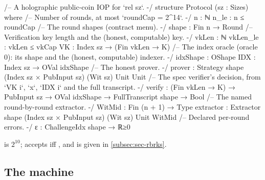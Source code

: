 \begin{leancode}[fontsize=\footnotesize,label={\footnotesize Contract/Protocol.lean (abridged)}]
/-- A holographic public-coin IOP for `rel sz`. -/
structure Protocol (sz : Sizes) where
  /-- Number of rounds, at most `roundCap = 2^14`. -/
  n : ℕ
  n_le : n ≤ roundCap
  /-- The round shapes (contract menu). -/
  shape : Fin n → Round
  /-- Verification key length and the (honest, computable) key. -/
  vkLen : ℕ
  vkLen_le : vkLen ≤ vkCap
  VK : Index sz → (Fin vkLen → K)
  /-- The index oracle (oracle 0): its shape and the (honest, computable) indexer. -/
  idxShape : OShape
  IDX : Index sz → OVal idxShape
  /-- The honest prover. -/
  prover : Strategy shape (Index sz × PubInput sz) (Wit sz) Unit Unit
  /-- The spec verifier's decision, from `VK i`, `x`, `IDX i` and the full transcript. -/
  verify : (Fin vkLen → K) → PubInput sz → OVal idxShape → FullTranscript shape → Bool
  /-- The named round-by-round extractor. -/
  WitMid : Fin (n + 1) → Type
  extractor : Extractor shape (Index sz × PubInput sz) (Wit sz) Unit WitMid
  /-- Declared per-round errors. -/
  ε : ChallengeIdx shape → ℝ≥0
\end{leancode}
\noindent {} is $2^{10}$;  accepts iff ,
and  is given in \cref{subsec:sec-rbrks}.


\subsection{The machine}\label{subsec:proto-machine}

